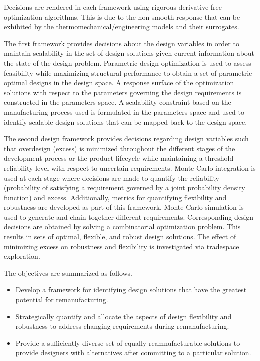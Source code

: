Decisions are rendered in each framework using rigorous derivative-free optimization algorithms. This is due to the non-smooth response that can be exhibited by the thermomechanical/engineering models and their surrogates.

The first framework provides decisions about the design variables in order to maintain scalability in the set of design solutions given current information about the state of the design problem. Parametric design optimization is used to assess feasibility while maximizing structural performance to obtain a set of parametric optimal designs in the design space. A response surface of the optimization solutions with respect to the parameters governing the design requirements is constructed in the parameters space. A scalability constraint based on the manufacturing process used is formulated in the parameters space and used to identify scalable design solutions that can be mapped back to the design space.

The second design framework provides decisions regarding design variables such that overdesign (excess) is minimized throughout the different stages of the development process or the product lifecycle while maintaining a threshold reliability level with respect to uncertain requirements. Monte Carlo integration is used at each stage where decisions are made to quantify the reliability (probability of satisfying a requirement governed by a joint probability density function) and excess. Additionally, metrics for quantifying flexibility and robustness are developed as part of this framework. Monte Carlo simulation is used to generate and chain together different requirements. Corresponding design decisions are obtained by solving a combinatorial optimization problem. This results in sets of optimal, flexible, and robust design solutions. The effect of minimizing excess on robustness and flexibility is investigated via tradespace exploration.

The objectives are summarized as follows.

\begin{itemize}
	\item{Develop a framework for identifying design solutions that have the greatest potential for remanufacturing.}
	\item{Strategically quantify and allocate the aspects of design flexibility and robustness to address changing requirements during remanufacturing.}
	\item{Provide a sufficiently diverse set of equally reamnufacturable solutions to provide designers with alternatives after committing to a particular solution.}
\end{itemize}

